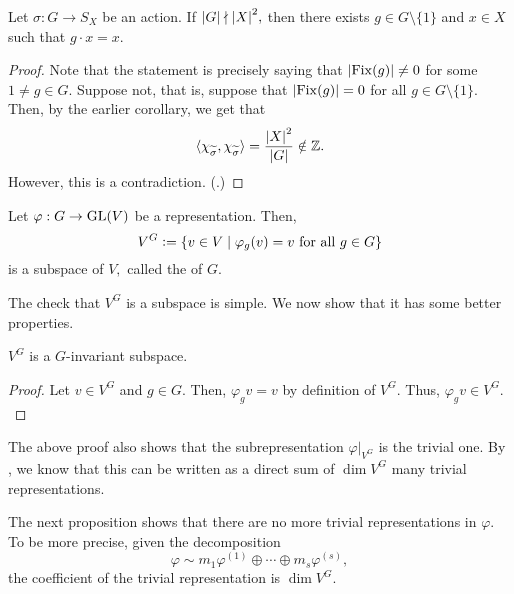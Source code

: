 \begin{cor}
	Let $\sigma : G \to S_X$ be an action. If ${\left\lvert G \right\lvert} \nmid {\left\lvert X \right\lvert}^2,$ then there exists $g \in G \setminus \{1\}$ and $x \in X$ such that $g \cdot x = x.$
\end{cor}

\begin{proof} 
	Note that the statement is precisely saying that ${\left\lvert \operatorname{Fix}(g) \right\lvert} \neq 0$ for some $1 \neq g \in G.$ Suppose not, that is, suppose that ${\left\lvert \operatorname{Fix}(g) \right\lvert} = 0$ for all $g \in G \setminus \{1\}.$ Then, by the earlier corollary, we get that
	\begin{equation*} 
		\langle \chi_{\widetilde{\sigma}}, \chi_{\widetilde{\sigma}}\rangle = \frac{{\left\lvert X \right\lvert}^2}{{\left\lvert G \right\lvert}} \notin \mathbb{Z}.
	\end{equation*}
	However, this is a contradiction. (.)
\end{proof}


\begin{defn}%
	Let $\varphi : G \to \operatorname{GL}(V)$ be a representation. Then,
	\begin{equation*} 
		V^G \vcentcolon= \{v \in V \mid \varphi_g(v) = v \text{ for all } g \in G\}
	\end{equation*}
	is a subspace of $V,$ called the  of $G.$
\end{defn}

The check that $V^G$ is a subspace is simple. We now show that it has some better properties.

\begin{prop}
	$V^G$ is a $G$-invariant subspace.
\end{prop}
\begin{proof} 
	Let $v \in V^G$ and $g \in G.$ Then, $\varphi_gv = v$ by definition of $V^G.$ Thus, $\varphi_gv \in V^G.$
\end{proof}

\begin{rem} \label{rem:identityactiononfixedspace}
	The above proof also shows that the subrepresentation $\varphi|_{V^G}$ is the trivial one. By , we know that this can be written as a direct sum of $\dim V^G$ many trivial representations.

	The next proposition shows that there are no more trivial representations in $\varphi.$ To be more precise, given the decomposition
	\begin{equation*} 
		\varphi \sim m_1 \varphi^{(1)} \oplus \cdots \oplus m_s \varphi^{(s)},
	\end{equation*}
	the coefficient of the trivial representation is $\dim V^G.$
\end{rem}

